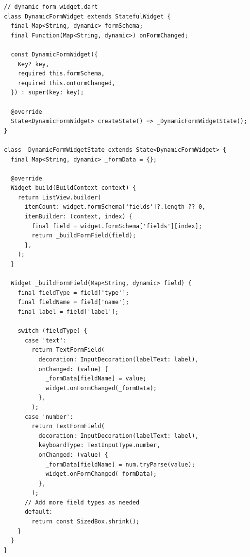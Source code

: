 \begin{lstlisting}
// dynamic_form_widget.dart
class DynamicFormWidget extends StatefulWidget {
  final Map<String, dynamic> formSchema;
  final Function(Map<String, dynamic>) onFormChanged;

  const DynamicFormWidget({
    Key? key,
    required this.formSchema,
    required this.onFormChanged,
  }) : super(key: key);

  @override
  State<DynamicFormWidget> createState() => _DynamicFormWidgetState();
}

class _DynamicFormWidgetState extends State<DynamicFormWidget> {
  final Map<String, dynamic> _formData = {};

  @override
  Widget build(BuildContext context) {
    return ListView.builder(
      itemCount: widget.formSchema['fields']?.length ?? 0,
      itemBuilder: (context, index) {
        final field = widget.formSchema['fields'][index];
        return _buildFormField(field);
      },
    );
  }

  Widget _buildFormField(Map<String, dynamic> field) {
    final fieldType = field['type'];
    final fieldName = field['name'];
    final label = field['label'];

    switch (fieldType) {
      case 'text':
        return TextFormField(
          decoration: InputDecoration(labelText: label),
          onChanged: (value) {
            _formData[fieldName] = value;
            widget.onFormChanged(_formData);
          },
        );
      case 'number':
        return TextFormField(
          decoration: InputDecoration(labelText: label),
          keyboardType: TextInputType.number,
          onChanged: (value) {
            _formData[fieldName] = num.tryParse(value);
            widget.onFormChanged(_formData);
          },
        );
      // Add more field types as needed
      default:
        return const SizedBox.shrink();
    }
  }
}
\end{lstlisting}